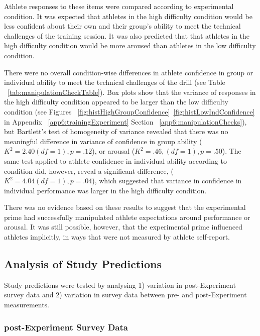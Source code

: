 Athlete responses to these items were compared according to experimental condition. It was expected that athletes in the high difficulty condition would be less confident about their own and their group's ability to meet the technical challenges of the training session.  It was also predicted that that athletes in the high difficulty condition would be more aroused than athletes in the low difficulty condition.



There were no overall condition-wise differences in athlete confidence in group or individual ability to meet the technical challenges of the drill (see Table ~\ref{tab:manipulationCheckTable}).  Box plots show that the variance of responses in the high difficulty condition appeared to be larger than the low difficulty condition (see Figures ~\ref{fig:histHighGroupConfidence}\nobreakdash~\ref{fig:histLowIndConfidence} in Appendix ~\ref{app6:trainingExperiment} Section ~\ref{app6:manipulationChecks}), but Bartlett's test of homogeneity of variance revealed that there was no meaningful difference in variance of confidence in group ability ($K^2 = 2.40 (df = 1), p = .12$), or arousal ($K^2 = .46, (df = 1), p = .50$).  The same test applied to athlete confidence in individual ability according to condition did, however, reveal a significant difference, ($K^2 = 4.04 (df = 1), p = .04$), which suggested that variance in confidence in individual performance was larger in the high difficulty condition.

There was no evidence based on these results to suggest that the experimental prime had successfully manipulated athlete expectations around performance or arousal.  It was still possible, however, that the experimental prime influenced athletes implicitly, in ways that were not measured by athlete self-report.




\subsection{Analysis of Study Predictions}

Study predictions were tested by analysing 1) variation in post-Experiment survey data and 2) variation in survey data between pre- and post-Experiment measurements.


\subsubsection{post-Experiment Survey Data}


